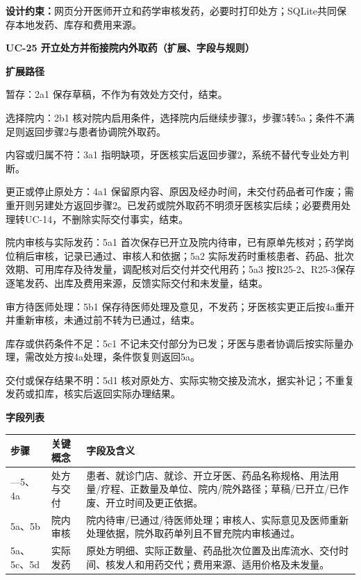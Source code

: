 \documentclass[UTF8,a4paper,zihao=-4,fontset=none]{ctexart}
\begin{document}
\noindent\textbf{设计约束：}网页分开医师开立和药学审核发药，必要时打印处方；SQLite共同保存本地发药、库存和费用来源。\par
\endgroup
\clearpage
\begingroup\small\linespread{1.04}\selectfont
\noindent\textbf{UC-25 开立处方并衔接院内外取药（扩展、字段与规则）}\par
\noindent\textbf{扩展路径}\par
\begin{description}\setlength{\itemsep}{0pt}\setlength{\parsep}{0pt}\setlength{\topsep}{2pt}
\item[2a] 暂存：2a1 保存草稿，不作为有效处方交付，结束。
\item[2b] 选择院内：2b1 核对院内启用条件，选择院内后继续步骤3，步骤5转5a；条件不满足则返回步骤2与患者协调院外取药。
\item[3a] 内容或归属不符：3a1 指明缺项，牙医核实后返回步骤2，系统不替代专业处方判断。
\item[4a] 更正或停止原处方：4a1 保留原内容、原因及经办时间，未交付药品者可作废；需重开则另建处方返回步骤2。已发药或院外取药不明须牙医核实后续；必要费用处理转UC-14，不删除实际交付事实，结束。
\item[5a] 院内审核与实际发药：5a1 首次保存已开立及院内待审，已有原单先核对；药学岗位稍后审核，记录已通过、审核人和依据；5a2 实际发药时重核患者、药品、批次效期、可用库存及待发量，调配核对后交付并交代用药；5a3 按R25-2、R25-3保存逐笔发药、出库及费用来源，反馈实际交付和未发量，结束。
\item[5b] 审方待医师处理：5b1 保存待医师处理及意见，不发药；牙医核实更正后按4a重开并重新审核，未通过前不转为已通过，结束。
\item[5c] 库存或供药条件不足：5c1 不记未交付部分为已发；牙医与患者协调后按实际量办理，需改处方按4a处理，条件恢复则返回5a。
\item[5d] 交付或保存结果不明：5d1 核对原处方、实际实物交接及流水，据实补记；不重复发药或扣库，核实后返回实际办理结果。
\end{description}
\noindent\textbf{字段列表}\par
{\setlength{\tabcolsep}{3pt}\renewcommand{\arraystretch}{1.04}
\noindent\begin{tabular}{@{}>{\raggedright\arraybackslash}p{1.2cm}>{\raggedright\arraybackslash}p{2.2cm}>{\raggedright\arraybackslash}p{12.3cm}@{}}
\toprule
步骤 & 关键概念 & 字段及含义 \\ \midrule
1—5、4a & 处方与交付 & 患者、就诊门店、就诊、开立牙医、药品名称规格、用法用量/疗程、正数量及单位、院内/院外路径；草稿/已开立/已作废、开立时间及更正依据。 \\
5a、5b & 院内审核 & 院内待审/已通过/待医师处理；审核人、实际意见及医师重新处理依据，院外取药单列且不冒充院内审核通过。 \\
5a、5c、5d & 实际发药 & 原处方明细、实际正数量、药品批次位置及出库流水、交付时间、核发人和用药交代；费用来源、适用价格及未发量。 \\
\bottomrule
\end{tabular}\par}
\end{document}
